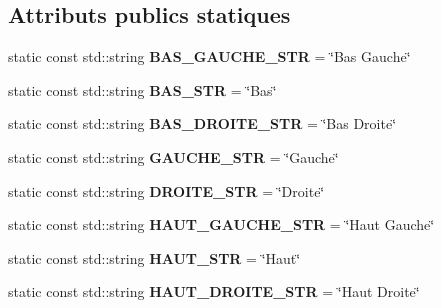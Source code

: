 \subsection*{Attributs publics statiques}
\begin{DoxyCompactItemize}
\item 
\mbox{\label{class_deplacement_touche_c_o_r_afdf392836add13aa11ca6b1980033365}} 
static const std\+::string {\bfseries B\+A\+S\+\_\+\+G\+A\+U\+C\+H\+E\+\_\+\+S\+TR} = \char`\"{}Bas Gauche\char`\"{}
\item 
\mbox{\label{class_deplacement_touche_c_o_r_aa6d8c538bc45a03d010a2846a09158ec}} 
static const std\+::string {\bfseries B\+A\+S\+\_\+\+S\+TR} = \char`\"{}Bas\char`\"{}
\item 
\mbox{\label{class_deplacement_touche_c_o_r_a773b246afc9dbc7a6e234efb13aac201}} 
static const std\+::string {\bfseries B\+A\+S\+\_\+\+D\+R\+O\+I\+T\+E\+\_\+\+S\+TR} = \char`\"{}Bas Droite\char`\"{}
\item 
\mbox{\label{class_deplacement_touche_c_o_r_a418f0d565a8cea14e356fed190bde964}} 
static const std\+::string {\bfseries G\+A\+U\+C\+H\+E\+\_\+\+S\+TR} = \char`\"{}Gauche\char`\"{}
\item 
\mbox{\label{class_deplacement_touche_c_o_r_a9b78d6c252247d027b5eeb242aacff1f}} 
static const std\+::string {\bfseries D\+R\+O\+I\+T\+E\+\_\+\+S\+TR} = \char`\"{}Droite\char`\"{}
\item 
\mbox{\label{class_deplacement_touche_c_o_r_ac20e28a5c996f98ed2581c92810c8cfa}} 
static const std\+::string {\bfseries H\+A\+U\+T\+\_\+\+G\+A\+U\+C\+H\+E\+\_\+\+S\+TR} = \char`\"{}Haut Gauche\char`\"{}
\item 
\mbox{\label{class_deplacement_touche_c_o_r_a2f400c69bddc7df26457bb03480b0db6}} 
static const std\+::string {\bfseries H\+A\+U\+T\+\_\+\+S\+TR} = \char`\"{}Haut\char`\"{}
\item 
\mbox{\label{class_deplacement_touche_c_o_r_a212fae38b34c18124f1cb90ec1a2fd98}} 
static const std\+::string {\bfseries H\+A\+U\+T\+\_\+\+D\+R\+O\+I\+T\+E\+\_\+\+S\+TR} = \char`\"{}Haut Droite\char`\"{}
\end{DoxyCompactItemize}
